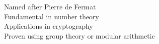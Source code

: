 \documentclass[preview]{standalone}
\begin{document}
Named after Pierre de Fermat\\Fundamental in number theory\\Applications in cryptography\\Proven using group theory or modular arithmetic\\
\end{document}

